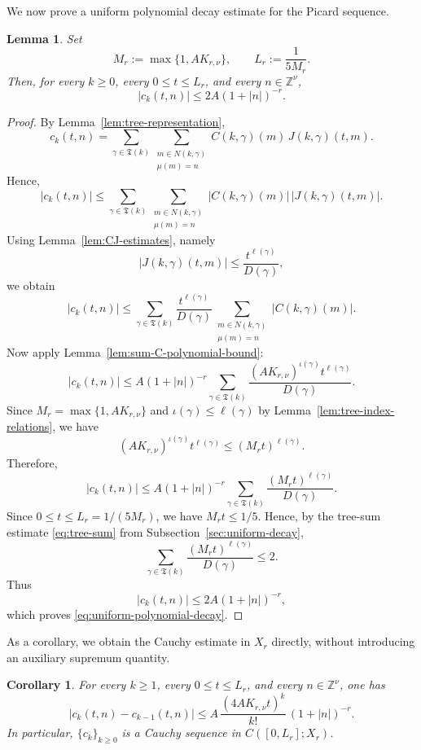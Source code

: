 \documentclass[12pt,reqno,tbtags]{amsart}
\newtheorem{lemma}{Lemma}[section]
\newtheorem{corollary}{Corollary}[section]
\newcommand\1{\mathbbm{1}}
\begin{document}
We now prove a uniform polynomial decay estimate for the Picard sequence.

\begin{lemma}\label{lem:uniform-polynomial-decay}
Set
\begin{equation}\label{eq:M-B-L-polynomial}
M_r:=\max\{1,AK_{r,\nu}\},
\qquad
L_r:=\frac{1}{5M_r}.
\end{equation}
Then, for every $k\ge0$, every $0\le t\le L_r$, and every $n\in\mathbb Z^\nu$,
\begin{equation}\label{eq:uniform-polynomial-decay}
|c_k(t,n)|\le 2A(1+|n|)^{-r}.
\end{equation}
\end{lemma}

\begin{proof}
By Lemma~\ref{lem:tree-representation},
\[
c_k(t,n)
=
\sum_{\gamma\in\mathfrak T(k)}
\sum_{\substack{m\in N(k,\gamma)\\ \mu(m)=n}}
C(k,\gamma)(m)\,J(k,\gamma)(t,m).
\]
Hence,
\[
|c_k(t,n)|
\le
\sum_{\gamma\in\mathfrak T(k)}
\sum_{\substack{m\in N(k,\gamma)\\ \mu(m)=n}}
|C(k,\gamma)(m)|\,|J(k,\gamma)(t,m)|.
\]
Using Lemma~\ref{lem:CJ-estimates}, namely
\[
|J(k,\gamma)(t,m)|\le \frac{t^{\ell(\gamma)}}{D(\gamma)},
\]
we obtain
\[
|c_k(t,n)|
\le
\sum_{\gamma\in\mathfrak T(k)}
\frac{t^{\ell(\gamma)}}{D(\gamma)}
\sum_{\substack{m\in N(k,\gamma)\\ \mu(m)=n}}
|C(k,\gamma)(m)|.
\]
Now apply Lemma~\ref{lem:sum-C-polynomial-bound}:
\[
|c_k(t,n)|
\le
A(1+|n|)^{-r}
\sum_{\gamma\in\mathfrak T(k)}
\frac{(AK_{r,\nu})^{\iota(\gamma)}t^{\ell(\gamma)}}{D(\gamma)}.
\]
Since $M_r=\max\{1,AK_{r,\nu}\}$ and $\iota(\gamma)\le \ell(\gamma)$ by
Lemma~\ref{lem:tree-index-relations}, we have
\[
(AK_{r,\nu})^{\iota(\gamma)}t^{\ell(\gamma)}
\le
(M_r t)^{\ell(\gamma)}.
\]
Therefore,
\[
|c_k(t,n)|
\le
A(1+|n|)^{-r}
\sum_{\gamma\in\mathfrak T(k)}
\frac{(M_r t)^{\ell(\gamma)}}{D(\gamma)}.
\]
Since $0\le t\le L_r=1/(5M_r)$, we have $M_r t\le 1/5$. Hence, by the tree-sum
estimate \eqref{eq:tree-sum} from Subsection~\ref{sec:uniform-decay},
\[
\sum_{\gamma\in\mathfrak T(k)}
\frac{(M_r t)^{\ell(\gamma)}}{D(\gamma)}
\le 2.
\]
Thus
\[
|c_k(t,n)|
\le
2A(1+|n|)^{-r},
\]
which proves \eqref{eq:uniform-polynomial-decay}.
\end{proof}

As a corollary, we obtain the Cauchy estimate in $X_r$ directly, without introducing
an auxiliary supremum quantity.

\begin{corollary}\label{lem:cauchy-estimate-polynomial}
For every $k\ge1$, every $0\le t\le L_r$, and every $n\in\mathbb Z^\nu$, one has
\begin{equation}\label{eq:cauchy-estimate-polynomial}
|c_k(t,n)-c_{k-1}(t,n)|
\le
A\,
\frac{(4AK_{r,\nu} t)^k}{k!}\,
(1+|n|)^{-r}.
\end{equation}
In particular, $\{c_k\}_{k\ge0}$ is a Cauchy sequence in $C([0,L_r];X_r)$.
\end{corollary}
\end{document}
